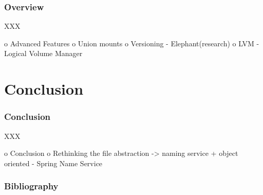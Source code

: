 
\begin{frame}
  \frametitle{Overview}

  XXX
\end{frame}

o Advanced Features
 o Union mounts
 o Versioning
   - Elephant(research)
 o LVM - Logical Volume Manager

%
%

\section{Conclusion}


\begin{frame}
  \frametitle{Conclusion}

  XXX
\end{frame}

o Conclusion
 o Rethinking the file abstraction -> naming service + object oriented
   - Spring Name Service

%
%

\begin{frame}
  \frametitle{Bibliography}

  
  
\end{frame}



